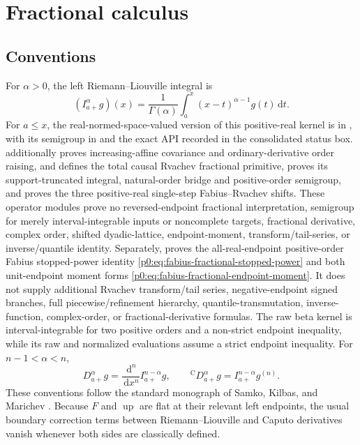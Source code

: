 \documentclass[11pt,oneside]{article}
\theoremstyle{definition}
\theoremstyle{remark}
\newcommand{\Up}{\operatorname{up}}
\newcommand{\dd}{\,\mathrm d}
\newcommand{\1}{\mathbf 1}
\begin{document}
\section{Fractional calculus}
\label{p8:sec:fractional}

\subsection{Conventions}

For \(\alpha>0\), the left Riemann--Liouville integral is
\begin{equation}
 (I_{a+}^{\alpha}g)(x)
 =\frac1{\Gamma(\alpha)}\int_a^x(x-t)^{\alpha-1}g(t)\dd t.
 \label{p8:eq:RL-definition}
\end{equation}
For \(a\le x\), the real-normed-space-valued version of this positive-real kernel is
 in , with its semigroup
in  and the exact API recorded in the
consolidated status box.   additionally
proves increasing-affine covariance and ordinary-derivative order raising, and
 defines the total causal Rvachev fractional
primitive, proves its support-truncated integral, natural-order bridge and positive-order
semigroup, and proves the three positive-real single-step Fabius--Rvachev shifts.  These
operator modules prove no
reversed-endpoint fractional interpretation, semigroup for merely interval-integrable
inputs or noncomplete targets, fractional derivative, complex order, shifted dyadic-lattice,
endpoint-moment, transform/tail-series, or inverse/quantile identity.  Separately,
 proves the
all-real-endpoint positive-order Fabius stopped-power identity
\eqref{p0:eq:fabius-fractional-stopped-power} and both unit-endpoint moment forms
\eqref{p0:eq:fabius-fractional-endpoint-moment}.  It does not supply additional Rvachev
transform/tail series, negative-endpoint signed branches, full piecewise/refinement hierarchy,
quantile-transmutation, inverse-function, complex-order, or fractional-derivative formulas.
The raw beta kernel is interval-integrable for two positive orders and a
non-strict endpoint inequality, while its raw and normalized evaluations assume a strict
endpoint inequality.
For \(n-1<\alpha<n\),
\begin{equation}
 D_{a+}^{\alpha}g=\frac{\dd^n}{\dd x^n}I_{a+}^{n-\alpha}g,
 \qquad
 {}^{\mathrm C}D_{a+}^{\alpha}g=I_{a+}^{n-\alpha}g^{(n)}.
 \label{p8:eq:RL-Caputo}
\end{equation}
These conventions follow the standard monograph of Samko, Kilbas, and Marichev
\cite{p8:samko}.  Because \(F\) and \(\Up\) are flat at their relevant left
endpoints, the usual boundary correction terms between Riemann--Liouville and
Caputo derivatives vanish whenever both sides are classically defined.
\end{document}
